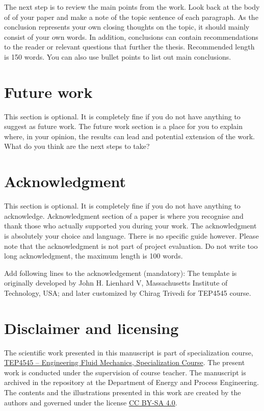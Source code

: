 \documentclass[subscriptcorrection,upint,varvw,mathalfa=cal=euler,barcolor=black,balance,hyphenate,french,pdf-a,nolists]{asmejour}
\begin{document}
The next step is to review the main points from the work. Look back at the body of of your paper and make a note of the topic sentence of each paragraph. As the conclusion represents your own closing thoughts on the topic, it should mainly consist of your own words. In addition, conclusions can contain recommendations to the reader or relevant questions that further the thesis. Recommended length is 150 words. You can also use bullet points to list out main conclusions.

\section*{Future work}
\label{sec:5}
This section is optional. It is completely fine if you do not have anything to suggest as future work. The future work section is a place for you to explain where, in your opinion, the results can lead and potential extension of the work. What do you think are the next steps to take?

\section*{Acknowledgment}
\label{sec:6}
This section is optional. It is completely fine if you do not have anything to acknowledge. Acknowledgment section of a paper is where you recognise and thank those who actually supported you during your work. The acknowledgment is absolutely your choice and language. There is no specific guide however. Please note that the acknowledgment is not part of project evaluation. Do not write too long acknowledgment, the maximum length is 100 words.

Add following lines to the acknowledgement (mandatory): The template is originally developed by John H. Lienhard V, Massachusetts Institute of Technology, USA; and later customized by Chirag Trivedi for TEP4545 course.

\section*{Disclaimer and licensing}
\label{sec:7}
The scientific work presented in this manuscript is part of specialization course, \href{https://www.ntnu.edu/studies/courses/TEP4545#tab=omEmnet}{TEP4545 -- Engineering Fluid Mechanics, Specialization Course}. The present work is conducted under the supervision of course teacher. The manuscript is archived in the repository at the Department of Energy and Process Engineering. The contents and the illustrations presented in this work are created by the authors and governed under the license \href{https://creativecommons.org/licenses/by-sa/4.0/}{CC BY-SA 4.0}.
\end{document}
